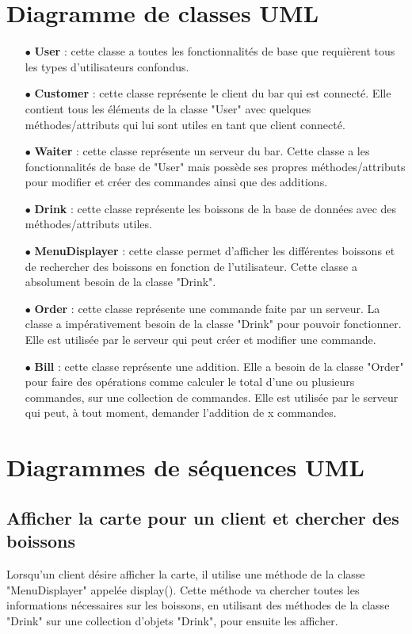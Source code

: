 


\section{Diagramme de classes UML}
\begin{itemize}
	\item[{$\bullet$}] \textbf{User} : cette classe a toutes les fonctionnalités de base que requièrent
	tous les types d'utilisateurs confondus.
	\item[{$\bullet$}] \textbf{Customer} : cette classe représente le client du bar qui est connecté.
	Elle contient tous les éléments de la classe "User" avec quelques méthodes/attributs qui lui sont utiles
	en tant que client connecté.
	\item[{$\bullet$}] \textbf{Waiter} : cette classe représente un serveur du bar. Cette classe a les
	fonctionnalités de base de "User" mais possède ses propres méthodes/attributs pour modifier et créer
	des commandes ainsi que des additions.
	\item[{$\bullet$}] \textbf{Drink} : cette classe représente les boissons de la base de données avec
	des méthodes/attributs utiles. 
	\item[{$\bullet$}] \textbf{MenuDisplayer} : cette classe permet d'afficher les
	différentes boissons et de rechercher des boissons en fonction de l'utilisateur. Cette classe a
	absolument besoin de la classe "Drink".
	\item[{$\bullet$}] \textbf{Order} : cette classe représente une commande faite par un serveur. La
	classe a impérativement besoin de la classe "Drink" pour pouvoir fonctionner. Elle est utilisée par
	le serveur qui peut créer et modifier une commande.
	\item[{$\bullet$}] \textbf{Bill} : cette classe représente une addition. Elle a besoin de
	la classe "Order" pour faire des opérations comme calculer le total d'une ou plusieurs
	commandes, sur une collection de commandes. Elle est utilisée par le serveur qui peut, à tout moment,
	demander l'addition de x commandes.
\end{itemize}
\section{Diagrammes de séquences UML}
\subsection{Afficher la carte pour un client et chercher des boissons}
Lorsqu'un client désire afficher la carte, il utilise une méthode de la classe "MenuDisplayer" appelée display(). Cette méthode va chercher toutes les informations nécessaires sur les boissons, en utilisant des méthodes de la classe "Drink" sur une collection d'objets "Drink", pour ensuite les afficher. 


